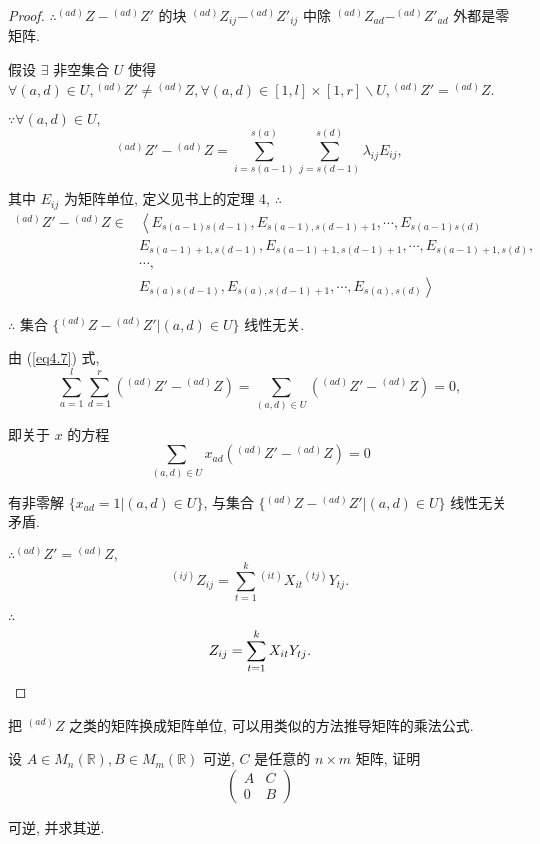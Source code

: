 \documentclass{ctexart}
\begin{document}
\begin{proof}
    $\therefore{}^{(ad)}Z-{}^{(ad)}Z'$ 的块 $^{(ad)}Z_{ij}-^{(ad)}Z'_{ij}$ 中除 $^{(ad)}Z_{ad}-^{(ad)}Z'_{ad}$ 外都是零矩阵.

    假设 $\exists$ 非空集合 $U$ 使得 $\forall (a,d)\in U,{}^{(ad)}Z'\neq{}^{(ad)}Z,\forall (a,d)\in[1,l]\times[1,r]\backslash U,{}^{(ad)}Z'={}^{(ad)}Z$.

    $\because\forall (a,d)\in U,$
    \[{}^{(ad)}Z'-{}^{(ad)}Z=\sum\limits_{i=s(a-1)}^{s(a)}\sum\limits_{j=s(d-1)}^{s(d)}\lambda_{ij}E_{ij},\]

    其中 $E_{ij}$ 为矩阵单位, 定义见书上的定理 4, $\therefore$
    \begin{align*}
        {}^{(ad)}Z'-{}^{(ad)}Z\in & \left<E_{s(a-1)s(d-1)},E_{s(a-1),s(d-1)+1},\cdots,E_{s(a-1)s(d)}\right. \\
        & E_{s(a-1)+1,s(d-1)},E_{s(a-1)+1,s(d-1)+1},\cdots,E_{s(a-1)+1,s(d)}, \\
        & \cdots, \\
        & \left.E_{s(a)s(d-1)},E_{s(a),s(d-1)+1},\cdots,E_{s(a),s(d)}\right>
    \end{align*}
    
    $\therefore$ 集合 $\{{}^{(ad)}Z-{}^{(ad)}Z'|(a,d)\in U\}$ 线性无关.

    由 (\ref{eq4.7}) 式,
    \[\sum\limits_{a=1}^{l}\sum\limits_{d=1}^{r}({}^{(ad)}Z'-{}^{(ad)}Z)=\sum\limits_{(a,d)\in U}({}^{(ad)}Z'-{}^{(ad)}Z)=0,\]

    即关于 $x$ 的方程
    \[\sum\limits_{(a,d)\in U}x_{ad}({}^{(ad)}Z'-{}^{(ad)}Z)=0\]

    有非零解 $\{x_{ad}=1|(a,d)\in U\}$, 与集合 $\{{}^{(ad)}Z-{}^{(ad)}Z'|(a,d)\in U\}$ 线性无关矛盾.

    $\therefore{}^{(ad)}Z'={}^{(ad)}Z,$
    \[^{(ij)}Z_{ij}=\sum\limits_{t=1}^k{}^{(it)}X_{it}{}^{(tj)}Y_{tj}.\]

    $\therefore$
    \[Z_{ij}=\sum\limits_{t=1}^kX_{it}Y_{tj}.\qedhere\]
\end{proof}
\begin{note}
    把 $^{(ad)}Z$ 之类的矩阵换成矩阵单位, 可以用类似的方法推导矩阵的乘法公式.
\end{note}
\begin{exercise}[第 4 章的习题 3.9]
    设 $A\in M_n(\mathbb{R}),B\in M_m(\mathbb{R})$ 可逆, $C$ 是任意的 $n\times m$ 矩阵, 证明
    \[\begin{pmatrix}
        A & C \\
        0 & B
    \end{pmatrix}\]

    可逆, 并求其逆.
\end{exercise}
\end{document}
